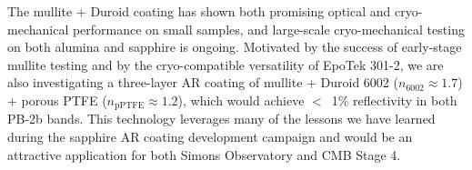 The mullite + Duroid coating has shown both promising optical and cryo-mechanical performance on small samples, and large-scale cryo-mechanical testing on both alumina and sapphire is ongoing. Motivated by the success of early-stage mullite testing and by the cryo-compatible versatility of EpoTek 301-2, we are also investigating a three-layer AR coating of mullite + Duroid 6002 ($n_{\mathrm{6002}} \approx 1.7$) + porous PTFE ($n_{\mathrm{pPTFE}} \approx 1.2$), which would achieve $<$~1\% reflectivity in both PB-2b bands. This technology leverages many of the lessons we have learned during the sapphire AR coating development campaign and would be an attractive application for both Simons Observatory and CMB Stage 4.

